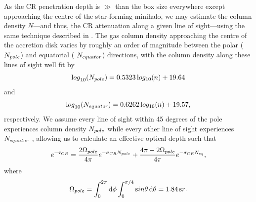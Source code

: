 \documentclass{thesis}
\begin{document}
As the CR penetration depth is $\gg$ than the box size everywhere except approaching the centre of the star-forming minihalo, we may estimate the column density $N$---and thus, the CR attenuation along a given line of sight---using the same technique described in \citet{Hummeletal2015}. 
The gas column density approaching the centre of the accretion disk varies by roughly an order of magnitude between the polar ($N_{\mathrm \small pole}$) and equatorial ( $N_{\mathrm \small equator}$) directions, with the column density  along these lines of sight well fit by
\begin{equation}
{\mathrm log}_{10}(N_{\mathrm \small pole}) = 0.5323\, {\mathrm log_{10}}(n) + 19.64
\end{equation}
and
\begin{equation}
{\mathrm log}_{10}(N_{\mathrm \small equator}) = 0.6262\, {\mathrm log_{10}}(n) + 19.57, 
\end{equation}
respectively. We assume every line of sight within 45 degrees of the pole experiences column density $N_{\mathrm \small pole}$ while every other line of sight experiences $N_{\mathrm \small equator}$ \citep{Hosokawaetal2011}, allowing us to calculate an effective optical depth such that
\begin{equation}
e^{-\tau_{\mathrm \small CR}} = \frac{2 \Omega_{\mathrm \small pole}}{4\pi} e^{-\sigma_{\mathrm \small CR} N_{\mathrm \small pole}} + \frac{4\pi - 2 \Omega_{\mathrm \small pole}}{4\pi} e^{-\sigma_{\mathrm \small CR} N_{\mathrm \small eq}},
\end{equation}
where
\begin{equation}
\Omega_{\mathrm \small pole} = \int_0^{2\pi}{\mathrm d}\phi \int_0^{\pi/4}{\mathrm sin}\theta \,{\mathrm d}\theta = 1.84\,{\mathrm sr}.
\end{equation}
\end{document}
